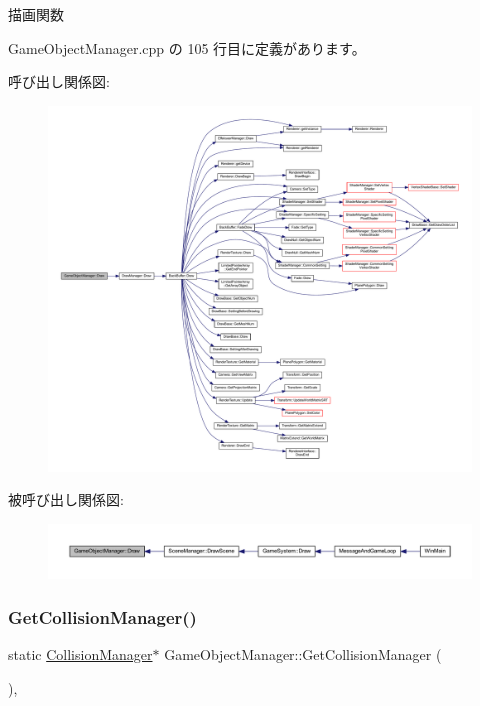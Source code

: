 描画関数 



 Game\+Object\+Manager.\+cpp の 105 行目に定義があります。

呼び出し関係図\+:
\nopagebreak
\begin{figure}[H]
\begin{center}
\leavevmode
\includegraphics[width=350pt]{class_game_object_manager_a0549bd4b6575ee28803c0ff8fd2be2ee_cgraph}
\end{center}
\end{figure}
被呼び出し関係図\+:
\nopagebreak
\begin{figure}[H]
\begin{center}
\leavevmode
\includegraphics[width=350pt]{class_game_object_manager_a0549bd4b6575ee28803c0ff8fd2be2ee_icgraph}
\end{center}
\end{figure}
\mbox{\label{class_game_object_manager_a41775a8308691a84b468a0aeeb1b3376}} 
\subsubsection{\texorpdfstring{Get\+Collision\+Manager()}{GetCollisionManager()}}
{\footnotesize\ttfamily static \mbox{\hyperlink{class_collision_manager}{Collision\+Manager}}$\ast$ Game\+Object\+Manager\+::\+Get\+Collision\+Manager (\begin{DoxyParamCaption}{ }\end{DoxyParamCaption})\hspace{0.3cm}{\ttfamily [inline]}, {\ttfamily [static]}}



